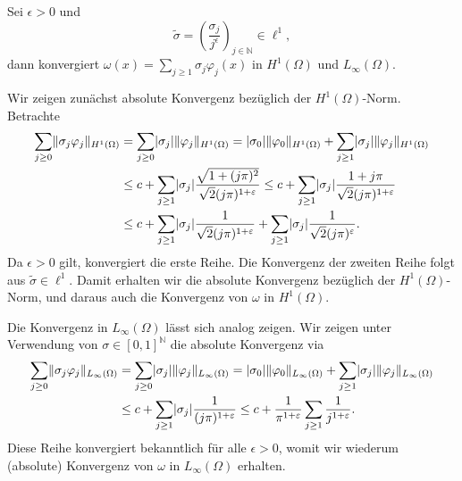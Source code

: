 \begin{Lemma}
    Sei $\epsilon > 0$ und
    \begin{equation}
        \tilde \sigma = \left(  \frac{\sigma_{j}}{j^{\epsilon}} \right)_{j \in \mathbb{N}} \in \ell^{1},
    \end{equation}
    dann konvergiert $\omega(x) = \sum_{j \geq 1} \sigma_{j} \varphi_{j}(x)$ in $H^{1}(\Omega)$ und $L_{\infty}(\Omega)$.

    \begin{Beweis}
        Wir zeigen zunächst absolute Konvergenz bezüglich der $H^{1}(\Omega)$-Norm.
        Betrachte
        \begin{align}
            \sum_{j \geq 0} \lVert\sigma_{j} \varphi_{j}\rVert_{H^{1}(\Omega)}
            &= \sum_{j \geq 0} \lvert\sigma_{j}\rvert \lVert\varphi_{j}\rVert_{H^{1}(\Omega)}
            = \lvert\sigma_{0}\rvert \lVert\varphi_{0}\rVert_{H^{1}(\Omega)} + \sum_{j \geq 1} \lvert\sigma_{j}\rvert \lVert\varphi_{j}\rVert_{H^{1}(\Omega)}
            \\&\leq c + \sum_{j \geq 1} \lvert\sigma_{j}\rvert \frac{\sqrt{1 + (j \pi)^{2}}}{\sqrt{2}(j \pi)^{1+\varepsilon}}
            \leq c + \sum_{j \geq 1} \lvert\sigma_{j}\rvert \frac{1 + j \pi}{\sqrt{2}(j \pi)^{1+\varepsilon}}
            \\&\leq c + \sum_{j \geq 1} \lvert\sigma_{j}\rvert \frac{1}{\sqrt{2}(j \pi)^{1+\varepsilon}} + \sum_{j \geq 1} \lvert\sigma_{j}\rvert \frac{1}{\sqrt{2}(j \pi)^{\varepsilon}}.
        \end{align}
        Da $\epsilon > 0$ gilt, konvergiert die erste Reihe.
        Die Konvergenz der zweiten Reihe folgt aus $\tilde \sigma \in \ell^{1}$.
        Damit erhalten wir die absolute Konvergenz bezüglich der $H^{1}(\Omega)$-Norm, und daraus auch die Konvergenz von $\omega$ in $H^{1}(\Omega)$.

        Die Konvergenz in $L_{\infty}(\Omega)$ lässt sich analog zeigen.
        Wir zeigen unter Verwendung von $\sigma \in [0, 1]^{\mathbb{N}}$ die absolute Konvergenz via
        \begin{align}
            \sum_{j \geq 0} \lVert\sigma_{j} \varphi_{j}\rVert_{L_{\infty}(\Omega)}
            &= \sum_{j \geq 0} \lvert\sigma_{j}\rvert \lVert\varphi_{j}\rVert_{L_{\infty}(\Omega)}
             = \lvert\sigma_{0}\rvert \lVert\varphi_{0}\rVert_{L_{\infty}(\Omega)} + \sum_{j \geq 1} \lvert\sigma_{j}\rvert \lVert\varphi_{j}\rVert_{L_{\infty}(\Omega)}
            \\&\leq c + \sum_{j \geq 1} \lvert\sigma_{j}\rvert \frac{1}{(j \pi)^{1+\varepsilon}}
               \leq c + \frac{1}{\pi^{1+\varepsilon}} \sum_{j \geq 1} \frac{1}{j^{1+\varepsilon}}.
        \end{align}
        Diese Reihe konvergiert bekanntlich für alle $\epsilon > 0$, womit wir wiederum (absolute) Konvergenz von $\omega$ in $L_{\infty}(\Omega)$ erhalten.
    \end{Beweis}
\end{Lemma}

